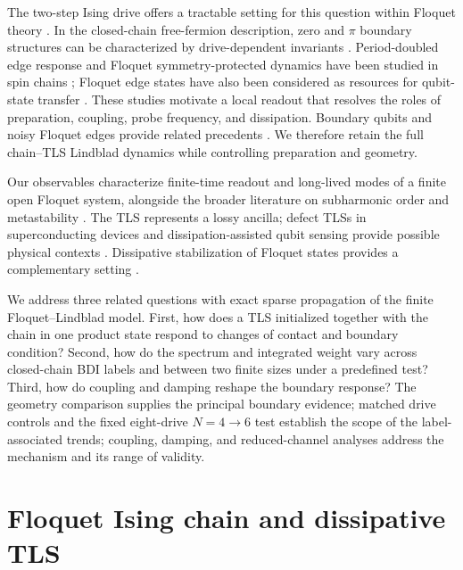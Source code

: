 \documentclass[12pt]{article}
\begin{document}
The two-step Ising drive offers a tractable setting for this question within Floquet theory \citep{shirley1965solution,sambe1973steady,bukov2015universal}. In the closed-chain free-fermion description, zero and $\pi$ boundary structures can be characterized by drive-dependent invariants \citep{kitagawa2010topological,jiang2011majorana,thakurathi2013floquet}. Period-doubled edge response and Floquet symmetry-protected dynamics have been studied in spin chains \citep{yates2021strong,yates2022longlived,zhang2022digital}; Floquet edge states have also been considered as resources for qubit-state transfer \citep{tan2020transfer}. These studies motivate a local readout that resolves the roles of preparation, coupling, probe frequency, and dissipation. Boundary qubits and noisy Floquet edges provide related precedents \citep{kemp2020boundary,rieder2018localization}. We therefore retain the full chain--TLS Lindblad dynamics while controlling preparation and geometry.

Our observables characterize finite-time readout and long-lived modes of a finite open Floquet system, alongside the broader literature on subharmonic order and metastability \citep{else2016floquet,keyserlingk2016absolute,macieszczak2016metastability,chen2024spectral}. The TLS represents a lossy ancilla; defect TLSs in superconducting devices and dissipation-assisted qubit sensing provide possible physical contexts \citep{martinis2005decoherence,muller2019tls,lisenfeld2019electric,abdurakhimov2022identification,wolski2020dissipation}. Dissipative stabilization of Floquet states provides a complementary setting \citep{ritter2025autonomous}.

We address three related questions with exact sparse propagation of the finite Floquet--Lindblad model. First, how does a TLS initialized together with the chain in one product state respond to changes of contact and boundary condition? Second, how do the spectrum and integrated weight vary across closed-chain BDI labels and between two finite sizes under a predefined test? Third, how do coupling and damping reshape the boundary response? The geometry comparison supplies the principal boundary evidence; matched drive controls and the fixed eight-drive $N=4\to6$ test establish the scope of the label-associated trends; coupling, damping, and reduced-channel analyses address the mechanism and its range of validity.

\section{Floquet Ising chain and dissipative TLS}
\label{sec:model}
\end{document}
